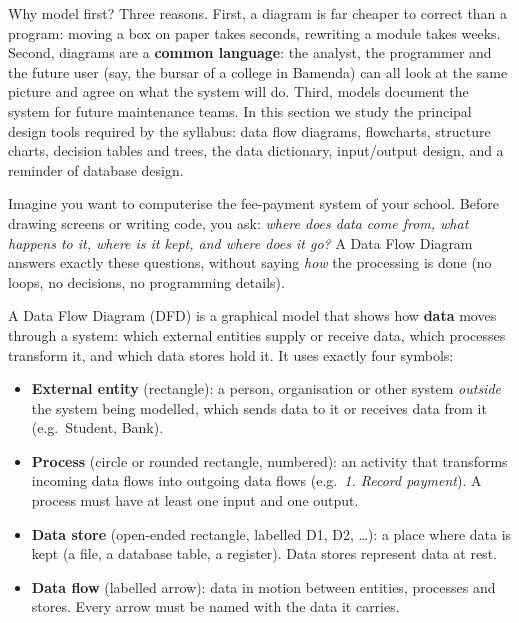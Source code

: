 \documentclass[11pt]{article}
\newcommand{\cle}[1]{{\popxbold\color{popdark}#1}}
\newcounter{popsec}
\newcounter{popsub}
\newcommand{\courssub}[1]{%
  \stepcounter{popsub}%
  \par\vspace{9pt}\noindent{\popxbold\fontsize{11.5}{13}\selectfont\color{popink}{\color{poporange}\thepopsec.\thepopsub}\hspace{6pt}#1}\par\nopagebreak\vspace{4pt}
}
\begin{document}
Why model first? Three reasons. First, a diagram is far cheaper to correct than a program: moving a box on paper takes seconds, rewriting a module takes weeks. Second, diagrams are a \textbf{common language}: the analyst, the programmer and the future user (say, the bursar of a college in Bamenda) can all look at the same picture and agree on what the system will do. Third, models document the system for future maintenance teams. In this section we study the principal design tools required by the syllabus: data flow diagrams, flowcharts, structure charts, decision tables and trees, the data dictionary, input/output design, and a reminder of database design.

\courssub{Data Flow Diagrams (DFD)}

Imagine you want to computerise the fee-payment system of your school. Before drawing screens or writing code, you ask: \emph{where does data come from, what happens to it, where is it kept, and where does it go?} A Data Flow Diagram answers exactly these questions, without saying \emph{how} the processing is done (no loops, no decisions, no programming details).

\begin{definition}
A \cle{Data Flow Diagram} (DFD) is a graphical model that shows how \textbf{data} moves through a system: which external entities supply or receive data, which processes transform it, and which data stores hold it. It uses exactly four symbols:
\begin{itemize}
\item \textbf{External entity} (rectangle): a person, organisation or other system \emph{outside} the system being modelled, which sends data to it or receives data from it (e.g.\ Student, Bank).
\item \textbf{Process} (circle or rounded rectangle, numbered): an activity that transforms incoming data flows into outgoing data flows (e.g.\ \emph{1. Record payment}). A process must have at least one input and one output.
\item \textbf{Data store} (open-ended rectangle, labelled D1, D2, \dots): a place where data is kept (a file, a database table, a register). Data stores represent data at rest.
\item \textbf{Data flow} (labelled arrow): data in motion between entities, processes and stores. Every arrow must be named with the data it carries.
\end{itemize}
\end{definition}
\end{document}

